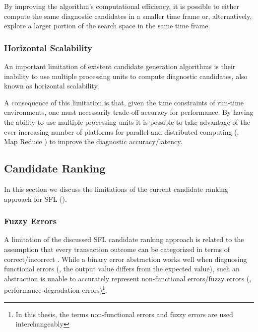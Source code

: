 By improving the algorithm's computational efficiency, it is possible
to either compute the same diagnostic candidates in a smaller time
frame or, alternatively, explore a larger portion of the search space
in the same time frame.
%


\subsubsection{Horizontal Scalability}
\label{sec:intro:research-goals:horizontal-scalability}

An important limitation of existent candidate generation algorithms is
their inability to use multiple processing units to compute diagnostic
candidates, also known as horizontal scalability.
%

A consequence of this limitation is that, given the time constraints
of run-time environments, one must necessarily trade-off accuracy for
performance.
%
By having the ability to use multiple processing units it is possible
to take advantage of the ever increasing number of platforms for
parallel and distributed computing (\eg, Map Reduce \cite{Dean04}) to
improve the diagnostic accuracy/latency.



\subsection{Candidate Ranking}
\label{sec:intro:research-goals:candidate-ranking}
In this section we discuss the limitations of the current candidate
ranking approach for \ac{SFL}
().

\subsubsection{Fuzzy Errors}
\label{sec:intro:research-goals:fuzzy-errors}
A limitation of the discussed \ac{SFL} candidate ranking approach is
related to the assumption that every transaction outcome can be
categorized in terms of correct/incorrect
\cite{Abreu09a,Kleer09,Casanova13,Chen13}.
%
While a binary error abstraction works well when diagnosing functional
errors (\ie, the output value differs from the expected value), such
an abstraction is unable to accurately represent non-functional
errors/fuzzy errors (\eg, performance degradation errors)\footnote{In
  this thesis, the terms non-functional errors and fuzzy errors are
  used interchangeably}.

